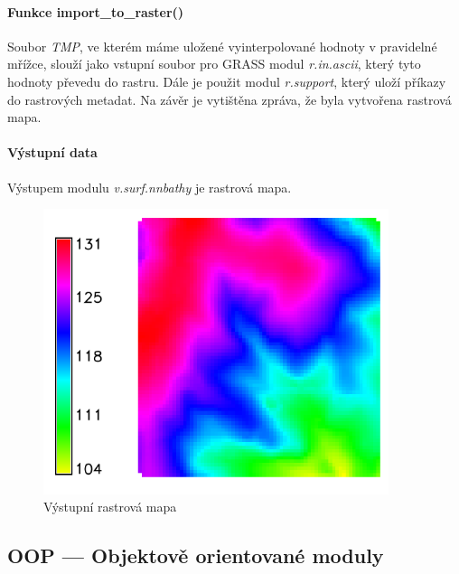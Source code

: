 \documentclass[12pt,a4paper]{article}
\begin{document}
\paragraph{Funkce import\_to\_raster()}

Soubor \emph{TMP}, ve kterém máme uložené vyinterpolované hodnoty v
pravidelné mřížce, slouží jako vstupní soubor pro GRASS modul
\emph{r.in.ascii}, který tyto hodnoty převedu do rastru. Dále je
použit modul \emph{r.support}, který uloží příkazy do rastrových
metadat. Na závěr je vytištěna zpráva, že byla vytvořena rastrová
mapa.

\paragraph{Výstupní data}
Výstupem modulu \emph{v.surf.nnbathy} je rastrová mapa.


\begin{figure}[h!]
\centering
\includegraphics[width=0.9\textwidth]{img/vystup_rast_map.png}
\caption{Výstupní rastrová mapa}
\label{fig:vystup_rast_map}
\end{figure}

\newpage
\subsection{OOP --- Objektově orientované moduly}
\end{document}
